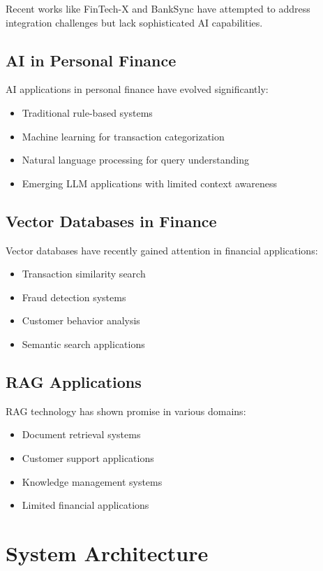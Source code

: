 \documentclass[conference]{IEEEtran}
\begin{document}
Recent works like FinTech-X\cite{fintech2} and BankSync\cite{banksync} have attempted to address integration challenges but lack sophisticated AI capabilities.

\subsection{AI in Personal Finance}
AI applications in personal finance have evolved significantly:
\begin{itemize}
\item Traditional rule-based systems
\item Machine learning for transaction categorization
\item Natural language processing for query understanding
\item Emerging LLM applications with limited context awareness
\end{itemize}

\subsection{Vector Databases in Finance}
Vector databases have recently gained attention in financial applications:
\begin{itemize}
\item Transaction similarity search\cite{vector2}
\item Fraud detection systems
\item Customer behavior analysis
\item Semantic search applications
\end{itemize}

\subsection{RAG Applications}
RAG technology has shown promise in various domains:
\begin{itemize}
\item Document retrieval systems
\item Customer support applications
\item Knowledge management systems
\item Limited financial applications
\end{itemize}

\section{System Architecture}
\end{document}
